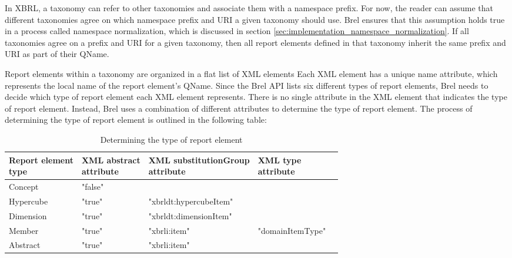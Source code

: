 In XBRL, a taxonomy can refer to other taxonomies and associate them with a namespace prefix.
For now, the reader can assume that different taxonomies agree on which namespace prefix and URI a given taxonomy should use.
Brel ensures that this assumption holds true in a process called namespace normalization, which is discussed in section \ref{sec:implementation_namespace_normalization}.
If all taxonomies agree on a prefix and URI for a given taxonomy, 
then all report elements defined in that taxonomy inherit the same prefix and URI as part of their QName.

Report elements within a taxonomy are organized in a flat list of XML elements
Each XML element has a unique name attribute, which represents the local name of the report element's QName.
Since the Brel API lists six different types of report elements, Brel needs to decide which type of report element each XML element represents.
There is no single attribute in the XML element that indicates the type of report element.
Instead, Brel uses a combination of different attributes to determine the type of report element.
The process of determining the type of report element is outlined in the following table:

\begin{table}[H]
    \centering
    \begin{tabular}{|l|l|l|l|l|}
        \hline
        \makecell[l]{\textbf{Report element} \\ \textbf{type}}  & 
        \makecell[l]{\textbf{XML abstract} \\ \textbf{attribute}} &
        \makecell[l]{\textbf{XML substitutionGroup} \\ \textbf{attribute}} & 
        \makecell[l]{\textbf{XML type} \\ \textbf{attribute}} \\ \hline
        Concept     & "false"   &                                      &                            \\ \hline
        Hypercube   & "true"    & "xbrldt:hypercubeItem"                &                            \\ \hline
        Dimension   & "true"    & "xbrldt:dimensionItem"                &                            \\ \hline
        Member      & "true"    & "xbrli:item"                          & "domainItemType" \\ \hline
        Abstract    & "true"    & "xbrli:item"                          &                            \\ \hline
    \end{tabular}
    \caption{Determining the type of report element}
    \label{tab:determining_report_element_type}
\end{table}

